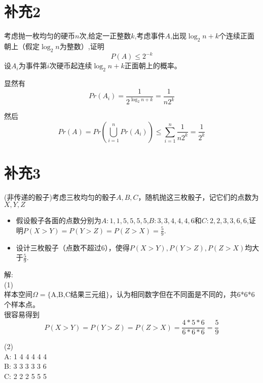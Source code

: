 \documentclass[a4paper]{ctexart}
\begin{document}
\section{补充2}
考虑抛一枚均匀的硬币$n$次,给定一正整数$k$,考虑事件$A$,出现$\log_2 {n}+k$个连续正面朝上（假定$\log_2 n$为整数）,证明
\[
P(A)\le 2^{-k}
\]
设$A_i$为事件第$i$次硬币起连续$\log_2 {n}+k$正面朝上的概率。

显然有
\[Pr(A_i)=\frac{1}{2^{\log_2 {n}+k}}=\frac{1}{n2^{k}}\]

然后
\[
Pr(A)=Pr(\bigcup_{i=1}^{n}Pr(A_i))\le \sum_{i=1}^{n} \frac{1}{n2^{k}}=\frac{1}{2^k}
\]

\section{补充3}
(非传递的骰子)考虑三枚均匀的骰子$A,B,C$，随机抛这三枚骰子，记它们的点数为$X,Y,Z$
\begin{itemize}
	\item 假设骰子各面的点数分别为$A:1,1,5,5,5,5$,$B:3,3,4,4,4,6$和$C:2,2,3,3,6,6$,证明$P(X>Y)=P(Y>Z)=P(Z>X)=\frac{5}{9}$.
	\item 设计三枚骰子（点数不超过6），使得$P(X>Y),P(Y>Z),P(Z>X)$均大于$\frac{5}{9}$.
\end{itemize}

\noindent 解:\\
\noindent(1)\\
\indent 样本空间$\Omega=\{\text{A,B,C结果三元组}\}$，认为相同数字但在不同面是不同的，共6*6*6个样本点。\\
很容易得到
\[
P(X>Y)=P(Y>Z)=P(Z>X)=\frac{4*5*6}{6*6*6}=\frac{5}{9}
\]

\noindent(2)\\
A: 1 4 4 4 4 4\\
B: 3 3 3 3 3 6\\
C: 2 2 2 5 5 5
\end{document}
